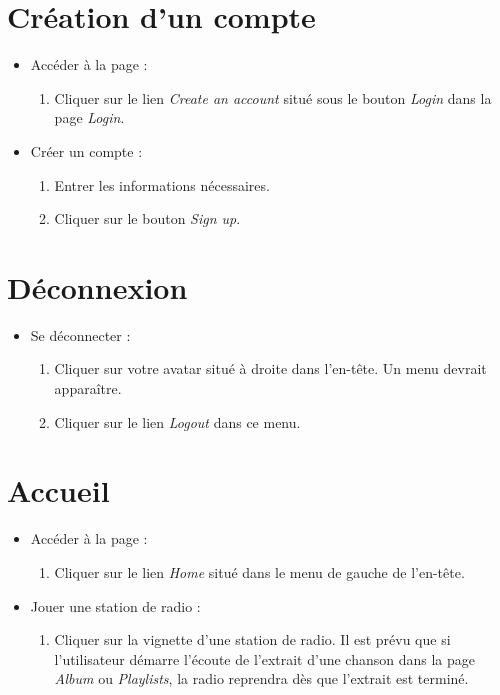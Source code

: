 \documentclass[12pt, letterpaper]{article}
\begin{document}
    \section*{Création d'un compte}
    \begin{itemize}
        \item Accéder à la page :
        \begin{enumerate}
            \item Cliquer sur le lien \textit{Create an account} situé sous le bouton \textit{Login} dans la page \textit{Login}.
        \end{enumerate}

        \item Créer un compte :
        \begin{enumerate}
            \item Entrer les informations nécessaires.
            \item Cliquer sur le bouton \textit{Sign up}.
        \end{enumerate}
    \end{itemize}

    \section*{Déconnexion}
    \begin{itemize}
    \item Se déconnecter :
        \begin{enumerate}
            \item Cliquer sur votre avatar situé à droite dans l'en-tête. Un menu devrait apparaître.
            \item Cliquer sur le lien \textit{Logout} dans ce menu.
        \end{enumerate}
    \end{itemize}

    \section*{Accueil}
    \begin{itemize}
        \item Accéder à la page :
        \begin{enumerate}
            \item Cliquer sur le lien \textit{Home} situé dans le menu de gauche de l'en-tête.
        \end{enumerate}

        \item Jouer une station de radio :
        \begin{enumerate}
            \item Cliquer sur la vignette d'une station de radio. Il est prévu que si l'utilisateur démarre l'écoute de l'extrait d'une chanson dans la page \textit{Album} ou \textit{Playlists}, la radio reprendra dès que l'extrait est terminé.
        \end{enumerate}
    \end{itemize}
    
\end{document}
